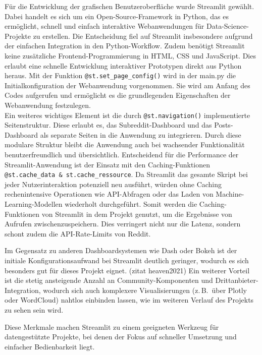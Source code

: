 Für die Entwicklung der grafischen Benutzeroberfläche wurde Streamlit gewählt. Dabei handelt es sich um ein Open-Source-Framework in Python, das es ermöglicht, schnell und einfach interaktive Webanwendungen für Data-Science-Projekte zu erstellen. Die Entscheidung fiel auf Streamlit insbesondere aufgrund der einfachen Integration in den Python-Workflow. Zudem benötigt Streamlit keine zusätzliche Frontend-Programmierung in HTML, CSS und JavaScript. Dies erlaubt eine schnelle Entwicklung interaktiver Prototypen direkt aus Python heraus. 
Mit der Funktion \verb|@st.set_page_config()| wird in der main.py die Initialkonfiguration der Webanwendung vorgenommen. Sie wird am Anfang des Codes aufgerufen und ermöglicht es die grundlegenden Eigenschaften der Webanwendung festzulegen. \\ %
Ein weiteres wichtiges Element ist die durch \verb|@st.navigation()| implementierte Seitenstruktur. Diese erlaubt es, das Subreddit-Dashboard und das Posts-Dashboard als separate Seiten in die Anwendung zu integrieren. Durch diese modulare Struktur bleibt die Anwendung auch bei wachsender Funktionalität benutzerfreundlich und übersichtlich.
Entscheidend für die Performance der Streamlit-Anwendung ist der Einsatz mit den Caching-Funktionen \verb|@st.cache_data & st.cache_ressource|. Da Streamlit das gesamte Skript bei jeder Nutzerinteraktion potenziell neu ausführt, würden ohne Caching rechenintensive Operationen wie API-Abfragen oder das Laden von Machine-Learning-Modellen wiederholt durchgeführt. Somit werden die Caching-Funktionen von Streamlit in dem Projekt genutzt, um die Ergebnisse von Aufrufen zwischenzuspeichern. Dies verringert nicht nur die Latenz, sondern schont zudem die API-Rate-Limits von Reddit.

Im Gegensatz zu anderen Dashboardsystemen wie Dash oder Bokeh ist der initiale Konfigurationsaufwand bei Streamlit deutlich geringer, wodurch es sich besonders gut für dieses Projekt eignet. (zitat heaven2021) 
Ein weiterer Vorteil ist die stetig ansteigende Anzahl an Community-Komponenten und Drittanbieter-Integration, wodurch sich auch komplexere Visualisierungen (z.\,B.\ über Plotly oder WordCloud) nahtlos einbinden lassen, wie im weiteren Verlauf des Projekts zu sehen sein wird. 


 


Diese Merkmale machen Streamlit zu einem geeigneten Werkzeug für datengestützte Projekte, bei denen der Fokus auf schneller Umsetzung und einfacher Bedienbarkeit liegt.
